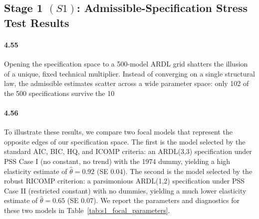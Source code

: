 \subsection{Stage 1 \texorpdfstring{$(S1)$}{}: Admissible-Specification Stress Test Results}
\label{subsec:S1_admissible_spec_new}

\paragraph{4.55}
Opening the specification space to a 500-model ARDL grid shatters the illusion of a unique, fixed technical multiplier. Instead of converging on a single structural law, the admissible estimates scatter across a wide parameter space: only 102 of the 500 specifications survive the 10%

\paragraph{4.56}
To illustrate these results, we compare two focal models that represent the opposite edges of our specification space. The first is the model selected by the standard AIC, BIC, HQ, and ICOMP criteria: an ARDL(3,3) specification under PSS Case I (no constant, no trend) with the 1974 dummy, yielding a high elasticity estimate of $\hat{\theta} = 0.92$ (SE 0.04). The second is the model selected by the robust RICOMP criterion: a parsimonious ARDL(1,2) specification under PSS Case II (restricted constant) with no dummies, yielding a much lower elasticity estimate of $\hat{\theta} = 0.65$ (SE 0.07). We report the parameters and diagnostics for these two models in Table~\ref{tab:s1_focal_parameters}.

